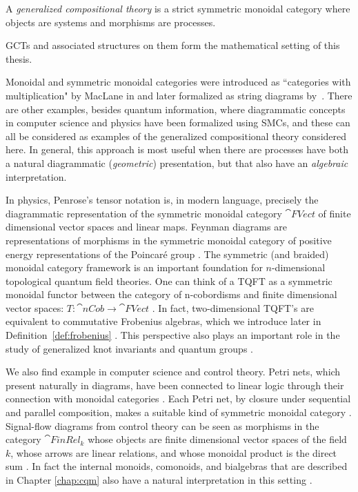 \begin{defn}
A \emph{generalized compositional theory} is a strict symmetric monoidal category where objects are systems and morphisms are processes.
\end{defn}

\noindent GCTs and associated structures on them form the mathematical setting of this thesis.

Monoidal and symmetric monoidal categories were introduced as ``categories with multiplication" by MacLane in \cite{maclane1963natural} and later formalized as string diagrams by~\cite{joyal1991geometry}. There are other examples, besides quantum information, where diagrammatic concepts in computer science and physics have been formalized using SMCs, and these can all be considered as examples of the generalized compositional theory considered here.  In general, this approach is most useful when there are processes have both a natural diagrammatic (\emph{geometric}) presentation, but that also have an \emph{algebraic} interpretation.

In physics, Penrose's tensor notation \cite{penrose1971applications} is, in modern language, precisely the diagrammatic representation of the symmetric monoidal category $\cat{FVect}$ of finite dimensional vector spaces and linear maps. Feynman diagrams are representations of morphisms in the symmetric monoidal category of positive energy representations of the Poincar\'{e} group \cite{baez2009prehistory}. The symmetric (and braided) monoidal category framework is an important foundation for $n$-dimensional topological quantum field theories. One can think of a TQFT as a symmetric monoidal functor between the category of n-cobordisms and finite dimensional vector spaces: $T:\cat{nCob}\to \cat{FVect}$ \cite{atiyah1988topological}. In fact, two-dimensional TQFT's are equivalent to commutative Frobenius algebras, which we introduce later in Definition~\ref{def:frobenius} \cite{abrams1996two,kock2004frobenius}. This perspective also plays an important role in the study of generalized knot invariants \cite{reshetikhin1990ribbon} and quantum groups \cite{baez2009prehistory}. 

We also find example in computer science and control theory. Petri nets, which present naturally in diagrams, have been connected to linear logic through their connection with monoidal categories \cite{abramsky2008petri,marti1989petri,sassone1998axiomatization}. Each Petri net, by closure under sequential and parallel composition, makes a suitable kind of symmetric monoidal category \cite{marti1989petri,meseguer1990petri}. Signal-flow diagrams from control theory can be seen as morphisms in the category $\cat{FinRel_k}$ whose objects are finite dimensional vector spaces of the field $k$, whose arrows are linear relations, and whose monoidal product is the direct sum \cite{baez2014categories}.  In fact the internal monoids, comonoids, and bialgebras that are described in Chapter \ref{chap:cqm} also have a natural interpretation in this setting \cite{baez2014categories,bonchi2015full}.
 
